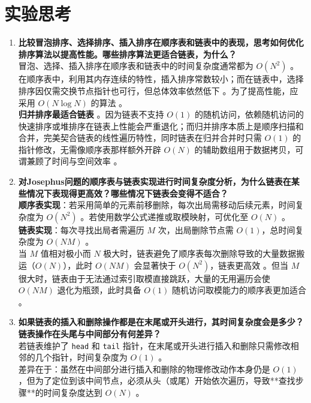 \documentclass[12pt,a4paper]{ctexart}
\begin{document}
	\section{实验思考}
	\noindent \begin{enumerate}
		\item \textbf{比较冒泡排序、选择排序、插入排序在顺序表和链表中的表现，思考如何优化排序算法以提高性能。哪些排序算法更适合链表，为什么？}\\
		冒泡、选择、插入排序在顺序表和链表中的时间复杂度通常都为 $O(N^2)$ 。在顺序表中，利用其内存连续的特性，插入排序常数较小；而在链表中，选择排序因仅需交换节点指针也可行，但总体效率依然低下 。为了提高性能，应采用 $O(N \log N)$ 的算法 。\\
		\textbf{归并排序最适合链表} 。因为链表不支持 $O(1)$ 的随机访问，依赖随机访问的快速排序或堆排序在链表上性能会严重退化；而归并排序本质上是顺序扫描和合并，完美契合链表的线性遍历特性，同时链表在归并合并时只需 $O(1)$ 的指针修改，无需像顺序表那样额外开辟 $O(N)$ 的辅助数组用于数据拷贝，可谓兼顾了时间与空间效率 。
		
		\item \textbf{对Josephus问题的顺序表与链表实现进行时间复杂度分析，为什么链表在某些情况下表现得更高效？哪些情况下链表会变得不适合？}\\
		\textbf{顺序表实现}：若采用简单的元素前移删除，每次出局需移动后续元素，时间复杂度为 $O(N^2)$ 。若使用数学公式递推或取模映射，可优化至 $O(N)$ 。\\
		\textbf{链表实现}：每次寻找出局者需遍历 $M$ 次，出局删除节点需 $O(1)$，总时间复杂度为 $O(NM)$ 。\\
		当 $M$ 值相对极小而 $N$ 极大时，链表避免了顺序表每次删除导致的大量数据搬运（$O(N)$），此时 $O(NM)$ 会显著快于 $O(N^2)$，链表更高效 。但当 $M$ 很大时，链表由于无法通过索引取模直接跳跃，大量的无用遍历会使 $O(NM)$ 退化为瓶颈，此时具备 $O(1)$ 随机访问取模能力的顺序表更加适合 。
		
		\item \textbf{如果链表的插入和删除操作都是在末尾或开头进行，其时间复杂度会是多少？链表操作在头尾与中间部分有何差异？}\\
		若链表维护了 \texttt{head} 和 \texttt{tail} 指针，在末尾或开头进行插入和删除只需修改相邻的几个指针，时间复杂度为 $O(1)$ 。\\
		差异在于：虽然在中间部分进行插入和删除的物理修改动作本身仍是 $O(1)$，但为了定位到该中间节点，必须从头（或尾）开始依次遍历，导致**查找步骤**的时间复杂度达到 $O(N)$ 。
		

\end{enumerate}
\end{document}
